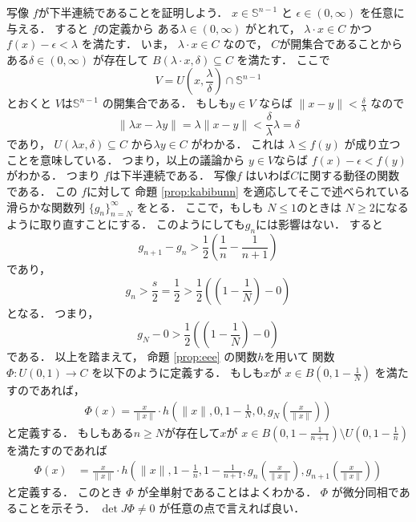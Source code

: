 \documentclass[leqno, a4paper, 12pt, dvipdfmx]{jsarticle}
\begin{document}
写像
$f$が下半連続であることを証明しよう．
$x\in \mathbb{S}^{n-1}$
と
$\epsilon\in (0, \infty)$
を任意に与える．
すると
$f$の定義から
ある$\lambda\in (0, \infty)$
がとれて，
$\lambda\cdot x\in C$
かつ
$f(x)-\epsilon<\lambda$
を満たす．
いま，
$\lambda\cdot x\in C$
なので，
$C$が開集合であることから
ある$\delta\in (0, \infty)$
が存在して
$B(\lambda\cdot x, \delta)\subseteq C$
を満たす．
ここで
\[
V=U\left(x, \frac{\lambda}{\delta}\right)\cap \mathbb{S}^{n-1}
\]
とおくと
$V$は$\mathbb{S}^{n-1}$
の開集合である．
もしも$y\in V$
ならば
$\|x-y\|<\frac{\delta}{\lambda}$
なので
\[
\|\lambda x-\lambda y\|=\lambda\|x-y\|
<\frac{\delta}{\lambda}\lambda=\delta
\]
であり，
$U(\lambda x, \delta)\subseteq C$
から$\lambda y\in C$
がわかる．
これは
$\lambda\le f(y)$
が成り立つことを意味している．
つまり，以上の議論から
$y\in V$ならば
$f(x)-\epsilon <f(y)$
がわかる．
つまり
$f$は下半連続である．
写像$f$
はいわば$C$に関する動径の関数である．
この
$f$に対して
命題
\ref{prop:kabibunn}
を適応してそこで述べられている
滑らかな関数列
$\{g_{n}\}_{n=N}^{\infty}$
をとる．
ここで，もしも
$N\le 1$のときは
$N\ge 2$になるように取り直すことにする．
このようにしても$g_{n}$には影響はない．
すると
\[
g_{n+1}-g_{n}>\frac{1}{2}\left(\frac{1}{n}-\frac{1}{n+1}\right)
\]
であり，
\[
g_{n}>\frac{s}{2}=\frac{1}{2}>\frac{1}{2}\left((1-\frac{1}{N})-0\right)
\]
となる．
つまり，
\[
g_{N}-0>\frac{1}{2}\left((1-\frac{1}{N})-0\right)
\]
である．
以上を踏まえて，
命題
\ref{prop:eee}
の関数$h$を用いて
関数
$\Phi\colon U(0, 1)\to C$
を以下のように定義する．
もしも$x$が
$x\in B\left(0, 1-\frac{1}{N}\right)$
を満たすのであれば，
\begin{align*}
\Phi(x)=
\displaystyle
\frac{x}{\|x\|}\cdot h\left(\|x\|, 0, 1-\frac{1}{N}, 0, 
g_{N}\left(\frac{x}{\|x\|}\right)\right)
\end{align*}
と定義する．
もしもある$n\ge N$が存在して$x$が
$x\in B\left(0, 1-\frac{1}{n+1}\right)\setminus U\left(0, 1-\frac{1}{n}\right)$
を満たすのであれば
\begin{align*}
\Phi(x)&=
\displaystyle
\frac{x}{\|x\|}\cdot h
\left(\|x\|, 1-\frac{1}{n}, 1-\frac{1}{n+1}, 
g_{n}\left(\frac{x}{\|x\|}\right), 
g_{n+1}\left(\frac{x}{\|x\|}\right)\right)
\end{align*}
と定義する．
このとき
$\Phi$
が全単射であることはよくわかる．
$\Phi$
が微分同相であることを示そう．
$\det J\Phi\neq 0$
が任意の点で言えれば良い．
\end{document}
